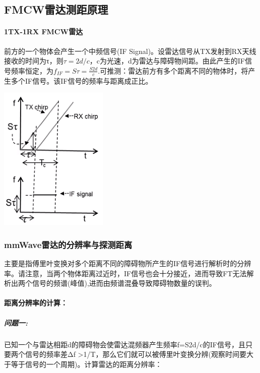 \documentclass[UTF8]{ctexart}
\begin{document}
\subsection{FMCW雷达测距原理}
\paragraph{1TX-1RX FMCW雷达}
前方的一个物体会产生一个中频信号(IF Signal)。设雷达信号从TX发射到RX天线接收的时间为τ，则$τ=2d/c$，c为光速，d为雷达与障碍物间距。由此产生的IF信号频率恒定，为$f_{IF}=Sτ=\frac{S2d}{c}.$可推测：雷达前方有多个距离不同的物体时，将产生多个IF信号。该IF信号的频率与距离成正比。

{\centering \includegraphics[width = .3\textwidth]{pic/TXRX.png}

}
\subsubsection{mmWave雷达的分辨率与探测距离}
主要是指傅里叶变换对多个距离不同的障碍物所产生的IF信号进行解析时的分辨率。请注意，当两个物体距离过近时，IF信号也会十分接近，进而导致FT无法解析出两个信号的频谱(峰值),进而由频谱混叠导致障碍物数量的误判。
\paragraph{距离分辨率的计算：}

\subparagraph{问题一:}已知一个与雷达相距d的障碍物会使雷达混频器产生频率f=S2d/c的IF信号，且只要两个信号的频率差Δf \textgreater 1/T，那么它们就可以被傅里叶变换分辨(观察时间要大于等于信号的一个周期)。计算雷达的距离分辨率：
\end{document}
